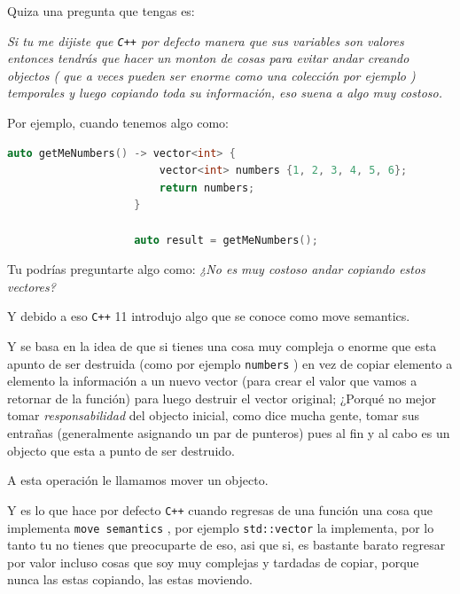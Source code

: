 \documentclass[12pt, fleqn]{report}                             %
\theoremstyle{break}                                            %
\newcommand{\textCode}[1]  { \texttt{#1} }                      %
\newcommand{\Cpp}{\ignorespaces\textCode{C++}}                  %
\begin{document}
                Quiza una pregunta que tengas es:

                \textit{
                    Si tu me dijiste que \Cpp por defecto manera que sus variables son valores
                    entonces tendrás que hacer un monton de cosas para evitar andar creando objectos (
                        que a veces pueden ser enorme como una colección por ejemplo
                    ) temporales y luego copiando toda su información, eso suena a algo muy costoso.
                }

                Por ejemplo, cuando tenemos algo como:
                \begin{lstlisting}[language=C++, gobble=20]
                    auto getMeNumbers() -> vector<int> {
                        vector<int> numbers {1, 2, 3, 4, 5, 6};
                        return numbers;
                    }

                    auto result = getMeNumbers();
                \end{lstlisting}

                Tu podrías preguntarte algo como:
                \textit{
                    ¿No es muy costoso andar copiando estos vectores? 
                }

                Y debido a eso \Cpp 11 introdujo algo que se conoce como move semantics.

                Y se basa en la idea de que si tienes una cosa muy compleja o enorme
                que esta apunto de ser destruida (como por ejemplo \textCode{numbers})
                en vez de copiar elemento a elemento la información a un nuevo vector (para crear
                el valor que vamos a retornar de la función) 
                para luego destruir el vector original; ¿Porqué no mejor tomar \emph{responsabilidad}
                del objecto inicial, como dice mucha gente, tomar sus entrañas  
                (generalmente asignando un par de punteros) pues al fin y al cabo es un objecto que esta a punto
                de ser destruido. 

                A esta operación le llamamos mover un objecto.

                \cite{ModernCppWhatYouNeedToKnow}

                Y es lo que hace por defecto \Cpp cuando regresas de una función una cosa que implementa
                \textCode{move semantics}, por ejemplo \textCode{std::vector} la implementa, por lo tanto
                tu no tienes que preocuparte de eso, asi que si, es bastante barato regresar por valor
                incluso cosas que soy muy complejas y tardadas de copiar, porque nunca las estas copiando, 
                las estas moviendo.
\end{document}
